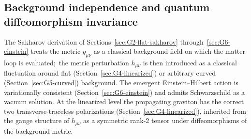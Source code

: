 \documentclass[11pt]{article}
\begin{document}
\subsection{Background independence and quantum diffeomorphism invariance}

The Sakharov derivation of Sections~\ref{sec:G2-flat-sakharov}
through~\ref{sec:G6-einstein} treats the metric $g_{\mu\nu}$ as a
classical background field on which the matter loop is evaluated;\
the metric perturbation $h_{\mu\nu}$ is then introduced as a
classical fluctuation around flat (Section~\ref{sec:G4-linearized})
or arbitrary curved (Section~\ref{sec:G5-curved}) background.  The
emergent Einstein--Hilbert action is variationally consistent
(Section~\ref{sec:G6-einstein}) and admits Schwarzschild as a
vacuum solution.  At the linearized level the propagating
graviton has the correct two transverse-traceless polarizations
(Section~\ref{sec:G4-linearized}), inherited from the gauge
structure of $h_{\mu\nu}$ as a symmetric rank-2 tensor under
diffeomorphisms of the background metric.
\end{document}
